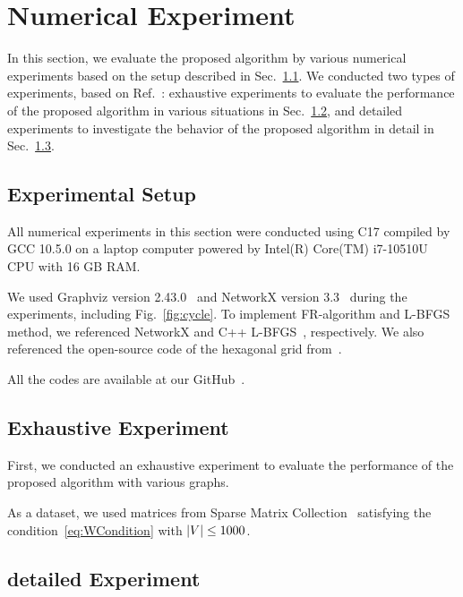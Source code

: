 \documentclass[dvipdfmx,journal]{IEEEtran}
\newcommand{\Cpp}{C\nolinebreak[4]\hspace{-.05em}\raisebox{.4ex}{\relsize{-3}{\textbf{++}}}}
\begin{document}
\section{Numerical Experiment} \label{sec:experiment}

In this section, we evaluate the proposed algorithm by various numerical experiments based on the setup described in Sec.~\ref{ssec:setup}.
We conducted two types of experiments, based on Ref.~\cite{8419285}: exhaustive experiments to evaluate the performance of the proposed algorithm in various situations in Sec.~\ref{ssec:exprAll}, and detailed experiments to investigate the behavior of the proposed algorithm in detail in Sec.~\ref{ssec:exprDetail}.

\subsection{Experimental Setup}\label{ssec:setup}

All numerical experiments in this section were conducted using \Cpp17 compiled by GCC 10.5.0 on a laptop computer powered by Intel(R) Core(TM) i7-10510U CPU with 16 GB RAM.

We used Graphviz version 2.43.0~\cite{ellsonGraphvizOpenSource2002} and NetworkX version 3.3~\cite{hagberg2008exploring} during the experiments, including Fig.~\ref{fig:cycle}.
To implement FR-algorithm and L-BFGS method, we referenced NetworkX and C++ L-BFGS~\cite{qiuYixuanLBFGSpp2024,okazakiChokkanLiblbfgs2024}, respectively.
We also referenced the open-source code of the hexagonal grid from~\cite{patelHexagonalGrids2013}.

All the codes are available at our GitHub~\cite{ThisPaperGitHub}.

\subsection{Exhaustive Experiment}\label{ssec:exprAll}

First, we conducted an exhaustive experiment to evaluate the performance of the proposed algorithm with various graphs.

As a dataset, we used matrices from Sparse Matrix Collection~\cite{davis2011university} satisfying the condition~\eqref{eq:WCondition} with $\abs{V} \leq 1000$.

\subsection{detailed Experiment}\label{ssec:exprDetail}
\end{document}
